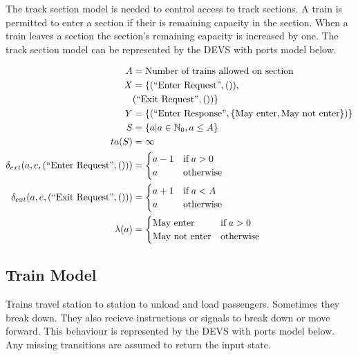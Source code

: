 The track section model is needed to control access to track sections. A train
is permitted to enter a section if their is remaining capacity in the section.
When a train leaves a section the section's remaining capacity is increased by
one. The track section model can be represented by the DEVS with ports model 
below.

\newcommand{\InEnterReq}[0]{(\text{``Enter Request''}, ())}
\newcommand{\InExitReq}[0]{(\text{``Exit Request''}, ())}

\newcommand{\OutEnterRes}[1]{(\text{``Enter Response''}, #1)}

\begin{align*}
    A &= \text{Number of trains allowed on section} \\
    X &= \{\InEnterReq, \\
        & \InExitReq
    \} \\
    Y &= \{\OutEnterRes{\{\text{May enter}, \text{May not enter}\}}\} \\
    S &= \{ a | a \in \mathbb{N}_0, a \leq A \} \\
    ta(S) &= \infty \\
    \delta_{ext}(a, e, \InEnterReq) &= 
        \begin{cases}
            a - 1 & \text{if\;} a > 0 \\
            a & \text{otherwise} \\
        \end{cases} \\
    \delta_{ext}(a, e, \InExitReq) &= 
        \begin{cases}
            a + 1 & \text{if\;} a < A \\
            a & \text{otherwise} \\
        \end{cases} \\
    \lambda(a) &= 
        \begin{cases}
            \text{May enter} & \text{if\;} a > 0 \\
            \text{May not enter} & \text{otherwise} \\
        \end{cases}
\end{align*}

\subsection{Train Model}

Trains travel station to station to unload and load passengers. Sometimes they
break down. They also recieve instructions or signals to break down or move
forward. This behaviour is represented by the DEVS with ports model below. Any
missing transitions are assumed to return the input state. 

